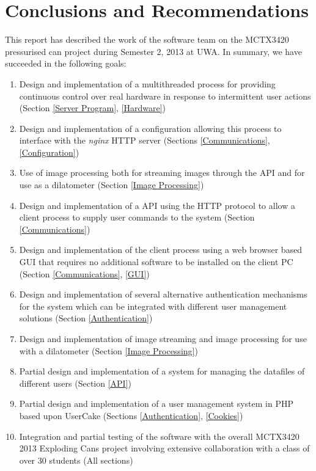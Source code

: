 \chapter{Conclusions and Recommendations}

This report has described the work of the software team on the MCTX3420 pressurised can project during Semester 2, 2013 at UWA.
In summary, we have succeeded in the following goals:

\begin{enumerate}
	\item Design and implementation of a multithreaded process for providing continuous control over real hardware in response to intermittent user actions (Section \ref{Server Program}, \ref{Hardware})
	\item Design and implementation of a configuration allowing this process to interface with the \emph{nginx} HTTP server (Sections \ref{Communications}, \ref{Configuration})
	\item Use of image processing both for streaming images through the API and for use as a dilatometer (Section \ref{Image Processing})
	\item Design and implementation of a API using the HTTP protocol to allow a client process to supply user commands to the system (Section \ref{Communications})
	\item Design and implementation of the client process using a web browser based GUI that requires no additional software to be installed on the client PC (Section \ref{Communications}, \ref{GUI})
	\item Design and implementation of several alternative authentication mechanisms for the system which can be integrated with different user management solutions (Section \ref{Authentication})
	\item Design and implementation of image streaming and image processing for use with a dilatometer (Section \ref{Image Processing})
	\item Partial design and implementation of a system for managing the datafiles of different users (Section \ref{API})
	\item Partial design and implementation of a user management system in PHP based upon UserCake (Sections \ref{Authentication}, \ref{Cookies})
	\item Integration and partial testing of the software with the overall MCTX3420 2013 Exploding Cans project involving extensive collaboration with a class of over 30 students (All sections)
\end{enumerate}

